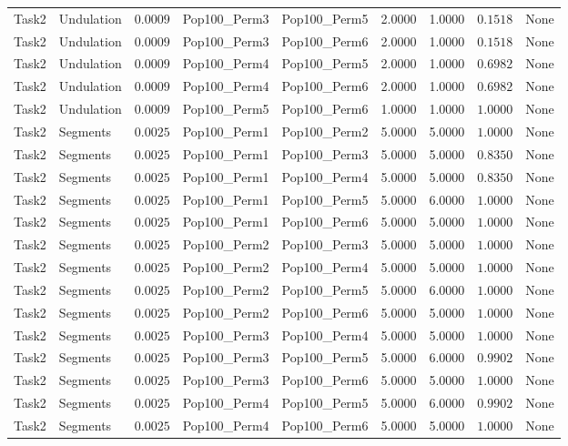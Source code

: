 \documentclass[8pt]{article}
\begin{document}
\begin{longtable}{llccccccc}
Task2 & Undulation & $0.0009$ & Pop100\_Perm3 & Pop100\_Perm5 & 2.0000 & 1.0000 & $0.1518$ & None \\
Task2 & Undulation & $0.0009$ & Pop100\_Perm3 & Pop100\_Perm6 & 2.0000 & 1.0000 & $0.1518$ & None \\
Task2 & Undulation & $0.0009$ & Pop100\_Perm4 & Pop100\_Perm5 & 2.0000 & 1.0000 & $0.6982$ & None \\
Task2 & Undulation & $0.0009$ & Pop100\_Perm4 & Pop100\_Perm6 & 2.0000 & 1.0000 & $0.6982$ & None \\
Task2 & Undulation & $0.0009$ & Pop100\_Perm5 & Pop100\_Perm6 & 1.0000 & 1.0000 & $1.0000$ & None \\
Task2 & Segments & $0.0025$ & Pop100\_Perm1 & Pop100\_Perm2 & 5.0000 & 5.0000 & $1.0000$ & None \\
Task2 & Segments & $0.0025$ & Pop100\_Perm1 & Pop100\_Perm3 & 5.0000 & 5.0000 & $0.8350$ & None \\
Task2 & Segments & $0.0025$ & Pop100\_Perm1 & Pop100\_Perm4 & 5.0000 & 5.0000 & $0.8350$ & None \\
Task2 & Segments & $0.0025$ & Pop100\_Perm1 & Pop100\_Perm5 & 5.0000 & 6.0000 & $1.0000$ & None \\
Task2 & Segments & $0.0025$ & Pop100\_Perm1 & Pop100\_Perm6 & 5.0000 & 5.0000 & $1.0000$ & None \\
Task2 & Segments & $0.0025$ & Pop100\_Perm2 & Pop100\_Perm3 & 5.0000 & 5.0000 & $1.0000$ & None \\
Task2 & Segments & $0.0025$ & Pop100\_Perm2 & Pop100\_Perm4 & 5.0000 & 5.0000 & $1.0000$ & None \\
Task2 & Segments & $0.0025$ & Pop100\_Perm2 & Pop100\_Perm5 & 5.0000 & 6.0000 & $1.0000$ & None \\
Task2 & Segments & $0.0025$ & Pop100\_Perm2 & Pop100\_Perm6 & 5.0000 & 5.0000 & $1.0000$ & None \\
Task2 & Segments & $0.0025$ & Pop100\_Perm3 & Pop100\_Perm4 & 5.0000 & 5.0000 & $1.0000$ & None \\
Task2 & Segments & $0.0025$ & Pop100\_Perm3 & Pop100\_Perm5 & 5.0000 & 6.0000 & $0.9902$ & None \\
Task2 & Segments & $0.0025$ & Pop100\_Perm3 & Pop100\_Perm6 & 5.0000 & 5.0000 & $1.0000$ & None \\
Task2 & Segments & $0.0025$ & Pop100\_Perm4 & Pop100\_Perm5 & 5.0000 & 6.0000 & $0.9902$ & None \\
Task2 & Segments & $0.0025$ & Pop100\_Perm4 & Pop100\_Perm6 & 5.0000 & 5.0000 & $1.0000$ & None \\

\end{longtable}
\end{document}
